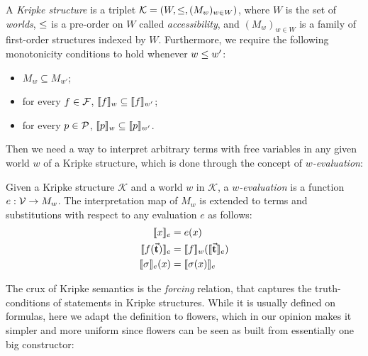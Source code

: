 \begin{definition}
  A \emph{Kripke structure} is a triplet $\mathcal{K} = ( W, \leq,
  (M_w)_{w \in W} )$, where $W$ is the set of \emph{worlds}, $\leq$ is
  a pre-order on $W$ called \emph{accessibility}, and $(M_w)_{w \in W}$ is a
  family of first-order structures indexed by $W$. Furthermore, we require the
  following monotonicity conditions to hold whenever $w \leq w'$:
  \begin{itemize}
    \item $M_w \subseteq M_{w'}$;
    \item for every $f \in \mathcal{F}$, $\llbracket f \rrbracket_w \subseteq
      \llbracket f \rrbracket_{w'}$;
    \item for every $p \in \mathcal{P}$, $\llbracket p \rrbracket_w \subseteq
      \llbracket p \rrbracket_{w'}$.
  \end{itemize}
\end{definition}

Then we need a way to interpret arbitrary terms with free variables in any given
world $w$ of a Kripke structure, which is done through the concept of
\emph{$w$-evaluation}:

\begin{definition}[$w$-evaluation]
  Given a Kripke structure $\mathcal{K}$ and a world $w$ in $\mathcal{K}$, a
  \emph{$w$-evaluation} is a function $e : \mathcal{V} \to M_w$.
  The interpretation map of $M_w$ is extended to terms and substitutions with
  respect to any evaluation $e$ as follows:
  \begin{align*}
  \llbracket x \rrbracket_e &= e(x) \\
  \llbracket f(\vec{\mathbf{t}}) \rrbracket_e &= \llbracket f \rrbracket_w(\llbracket \vec{\mathbf{t}} \rrbracket_e) \\
  \llbracket \sigma \rrbracket_e(x) &= \llbracket \sigma(x) \rrbracket_e
  \end{align*}
\end{definition}

The crux of Kripke semantics is the \emph{forcing} relation, that captures the
truth-conditions of statements in Kripke structures. While it is usually defined
on formulas, here we adapt the definition to flowers, which in our opinion makes
it simpler and more uniform since flowers can be seen as built from essentially
one big constructor:

